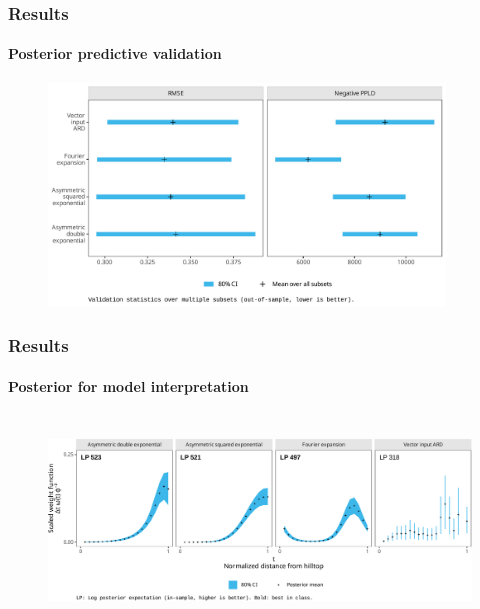 \documentclass{snedecorbeamer}
\begin{document}
\begin{frame}
  \frametitle{Results}
  \framesubtitle{Posterior predictive validation}

  \begin{figure}
    \centering
    \includegraphics[height=16em]{inc/wepp_validation_summary_mini.pdf}
  \end{figure}

\end{frame}

\begin{frame}
  \frametitle{Results}
  \framesubtitle{Posterior for model interpretation}

  \begin{figure}
    \centering
    \includegraphics[height=15em]{inc/wepp_weight_posterior_mini.pdf}
  \end{figure}

\end{frame}
\end{document}
